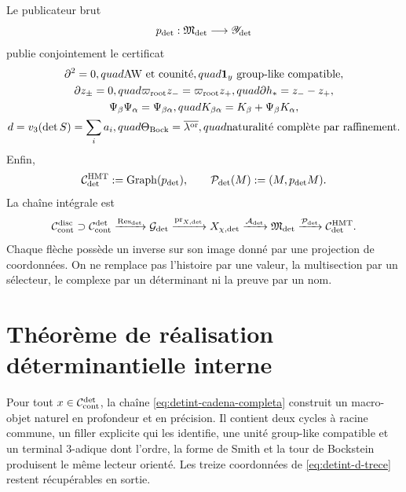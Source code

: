 Le publicateur brut
\begin{equation}\label{eq:detint-publicador-crudo}
 p_{\rm det}:\mathfrak M_{\rm det}\longrightarrow\mathscr Y_{\rm det}
\end{equation}
publie conjointement le certificat
\begin{equation}\label{eq:detint-certificado-publicado}
\begin{gathered}
 \partial^2=0,quad \text{AW et counité},quad
 \mathbf1_y\text{ group-like compatible},\\
 \partial z_\pm=0,quad
 \varpi_{\rm root}z_-=\varpi_{\rm root}z_+,quad
 \partial h_*=z_--z_+,\\
 \Psi_\beta\Psi_\alpha=\Psi_{\beta\alpha},quad
 K_{\beta\alpha}=K_\beta+\Psi_\beta K_\alpha,\\
 d=v_3(\det S)=\sum_i a_i,quad
 \Theta_{\rm Bock}=\overline{\lambda^{\rm or}},quad
 \text{naturalité complète par raffinement}.
\end{gathered}
\end{equation}
Enfin,
\begin{equation}\label{eq:detint-graph-p}
 \mathcal C_{\rm det}^{\rm HMT}:=\operatorname{Graph}(p_{\rm det}),
 \qquad
 \mathcal P_{\rm det}(M):=(M,p_{\rm det}M).
\end{equation}
La chaîne intégrale est
\begin{equation}\label{eq:detint-cadena-completa}
 \mathcal C_{\rm cont}^{\rm disc}\supset
 \mathcal C_{\rm cont}^{\rm det}
 \xrightarrow{\operatorname{Res}_{\rm det}}\mathcal G_{\rm det}
 \xrightarrow{\operatorname{pr}_{X,{\rm det}}}X_{\chi,{\rm det}}
 \xrightarrow{\mathcal A_{\rm det}}\mathfrak M_{\rm det}
 \xrightarrow{\mathcal P_{\rm det}}\mathcal C_{\rm det}^{\rm HMT}.
\end{equation}
Chaque flèche possède un inverse sur son image donné par une projection de
coordonnées. On ne remplace pas l'histoire par une valeur, la multisection par un sélecteur,
le complexe par un déterminant ni la preuve par un nom.

\section{Théorème de réalisation déterminantielle interne}

\begin{theorem}
\label{thm:detint-realizacion}
Pour tout \(x\in\mathcal C_{\rm cont}^{\rm det}\), la chaîne
\eqref{eq:detint-cadena-completa} construit un macro-objet naturel en
profondeur et en précision. Il contient deux cycles à racine commune, un filler
explicite qui les identifie, une unité group-like compatible et un terminal
\(3\)-adique dont l'ordre, la forme de Smith et la tour de Bockstein produisent le même
lecteur orienté. Les treize coordonnées de \eqref{eq:detint-d-trece}
restent récupérables en sortie.
\end{theorem}

